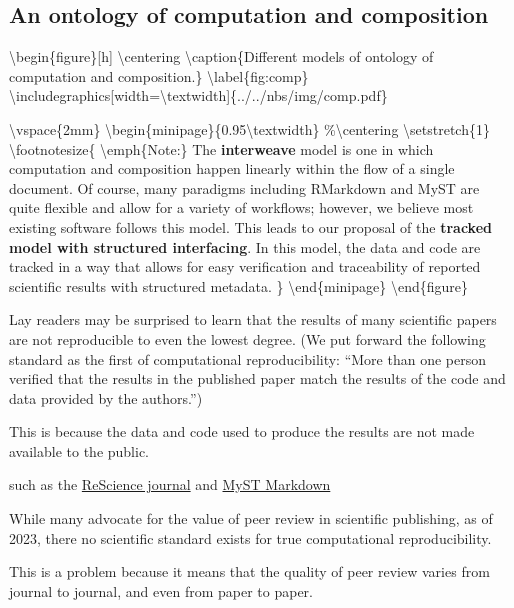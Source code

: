 \hypertarget{an-ontology-of-computation-and-composition}{%
\subsection{An ontology of computation and composition}\label{an-ontology-of-computation-and-composition}}

\textbackslash{}begin\{figure\}[h]
\textbackslash{}centering
\textbackslash{}caption\{Different models of ontology of computation and composition.\}
\textbackslash{}label\{fig:comp\}
\textbackslash{}includegraphics[width=\textbackslash{}textwidth]\{../../nbs/img/comp.pdf\}

\textbackslash{}vspace\{2mm\}
\textbackslash{}begin\{minipage\}\{0.95\textbackslash{}textwidth\}
\%\textbackslash{}centering
\textbackslash{}setstretch\{1\}
\textbackslash{}footnotesize\{
\textbackslash{}emph\{Note:\} The \textbf{interweave} model is one in which computation and composition happen linearly within the flow of a single document. Of course, many paradigms including RMarkdown and MyST are quite flexible and allow for a variety of workflows; however, we believe most existing software follows this model. This leads to our proposal of the \textbf{tracked model with structured interfacing}. In this model, the data and code are tracked in a way that allows for easy verification and traceability of reported scientific results with structured metadata.
\}
\textbackslash{}end\{minipage\}
\textbackslash{}end\{figure\}

Lay readers may be surprised to learn that the results of many scientific papers are not reproducible to even the lowest degree. (We put forward the following standard as the first of computational reproducibility: ``More than one person verified that the results in the published paper match the results of the code and data provided by the authors.'') 

This is because the data and code used to produce the results are not made available to the public. 

such as the \href{https://rescience.github.io/}{ReScience journal} and \href{https://jupyterbook.org/en/stable/content/myst.html}{MyST Markdown}

While many advocate for the value of peer review in scientific publishing, as of 2023, there no scientific standard exists for true computational reproducibility. 

This is a problem because it means that the quality of peer review varies from journal to journal, and even from paper to paper. 

